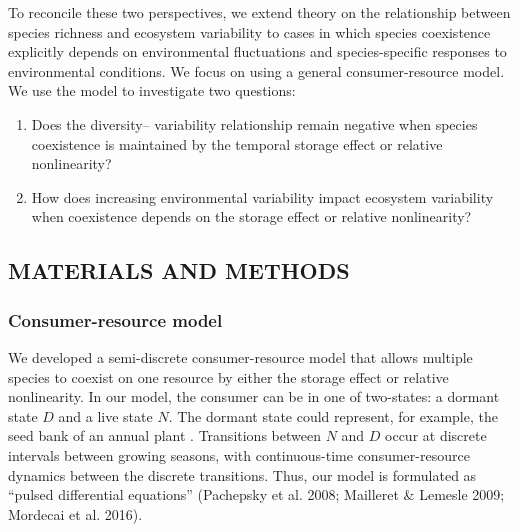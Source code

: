 \documentclass[12pt,]{article}
\begin{document}
To reconcile these two perspectives, we extend theory on the
relationship between species richness and ecosystem variability to cases
in which species coexistence explicitly depends on environmental
fluctuations and species-specific responses to environmental conditions.
We focus on
using a general consumer-resource model. We use the model to investigate
two questions:

\begin{enumerate}
\def\labelenumi{\arabic{enumi}.}
\item
  Does the diversity-- variability relationship remain
  negative when species coexistence is maintained by the temporal
  storage effect or relative nonlinearity?
\item
  How does increasing environmental variability impact ecosystem
  variability when coexistence depends on the storage effect or relative
  nonlinearity?
\end{enumerate}

\subsection{MATERIALS AND METHODS}\label{materials-and-methods}

\subsubsection{Consumer-resource model}\label{consumer-resource-model}

We developed a semi-discrete consumer-resource model that allows
multiple species to coexist on one resource by either the storage effect
or relative nonlinearity. In our model, the consumer can be in one of
two-states: a dormant state \(D\) and a live state \(N\). The dormant
state could represent, for example, the seed bank of an annual plant
. Transitions between \(N\)
and \(D\) occur at discrete intervals between growing seasons, with
continuous-time consumer-resource dynamics between the discrete
transitions. Thus, our model is formulated as ``pulsed differential
equations'' (Pachepsky et al. 2008; Mailleret \& Lemesle 2009; Mordecai
et al. 2016).
\end{document}
